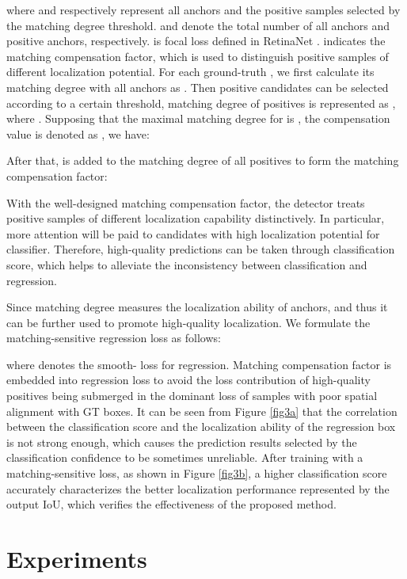 \documentclass[letterpaper]{article} \usepackage{aaai21}  \usepackage{times}  \usepackage{helvet} \usepackage{courier}  \usepackage[hyphens]{url}  \usepackage{graphicx} \urlstyle{rm} \def\UrlFont{\rm}  \usepackage{natbib}  \usepackage{caption} \frenchspacing  \setlength{\pdfpagewidth}{8.5in}  \setlength{\pdfpageheight}{11in}  \usepackage{url}
\begin{document}
where  and   respectively represent all anchors and the positive samples selected by the matching degree threshold.  and   denote the total number of all anchors and positive anchors, respectively.   is focal loss defined in RetinaNet \cite{lin2017focal}.  indicates the matching compensation factor, which is used to distinguish positive samples of different localization potential. For each ground-truth , we first calculate its matching degree with all anchors as . Then positive candidates can be selected according to a certain threshold, matching degree of positives is represented as , where . Supposing that the maximal matching degree for  is , the compensation value is denoted as , we have:


After that,   is added to the matching degree of all positives to form the matching compensation factor:


With the well-designed matching compensation factor, the detector treats positive samples of different localization capability distinctively. In particular, more attention will be paid to candidates with high localization potential for classifier. Therefore, high-quality predictions can be taken through classification score, which helps to alleviate the inconsistency between classification and regression.

Since matching degree measures the localization ability of anchors, and thus it can be further used to promote high-quality localization. We formulate the matching-sensitive regression loss as follows:

where  denotes the smooth- loss for regression. Matching compensation factor  is embedded into regression loss to avoid the loss contribution of high-quality positives being submerged in the dominant loss of samples with poor spatial alignment with GT boxes.
It can be seen from Figure \ref{fig3a} that the correlation between the classification score and the localization ability of the regression box is not strong enough, which causes the prediction results selected by the classification confidence to be sometimes unreliable. After training with a matching-sensitive loss, as shown in Figure \ref{fig3b}, a higher classification score accurately characterizes the better localization performance represented by the output IoU, which verifies the effectiveness of the proposed method.
\section{Experiments}
\end{document}
